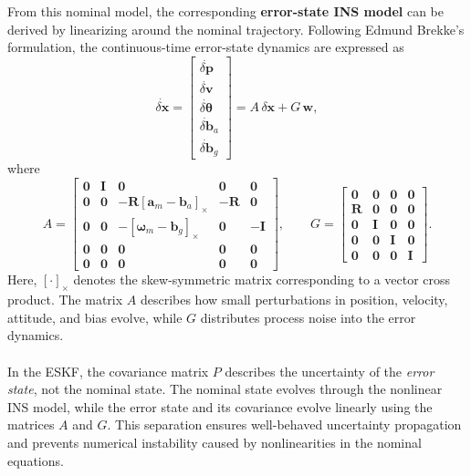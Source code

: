 \\ \\
From this nominal model, the corresponding \textbf{error-state INS model} can be derived by linearizing around the nominal trajectory. Following Edmund Brekke’s formulation, the continuous-time error-state dynamics are expressed as
$$
    \dot{\delta\mathbf{x}} =
    \begin{bmatrix}
        \dot{\delta\mathbf{p}} \\ \dot{\delta\mathbf{v}} \\ \dot{\delta\boldsymbol{\theta}} \\ \dot{\delta\mathbf{b}}_a \\ \dot{\delta\mathbf{b}}_g
    \end{bmatrix}
    =
    A \, \delta\mathbf{x} + G\,\mathbf{w},
$$
where
$$
A =
\begin{bmatrix}
    \mathbf{0} & \mathbf{I} & \mathbf{0} & \mathbf{0} & \mathbf{0} \\
    \mathbf{0} & \mathbf{0} & -\mathbf{R}[\mathbf{a}_m - \mathbf{b}_a]_\times & -\mathbf{R} & \mathbf{0} \\
    \mathbf{0} & \mathbf{0} & -[\boldsymbol{\omega}_m - \mathbf{b}_g]_\times & \mathbf{0} & -\mathbf{I} \\
    \mathbf{0} & \mathbf{0} & \mathbf{0} & \mathbf{0} & \mathbf{0} \\
    \mathbf{0} & \mathbf{0} & \mathbf{0} & \mathbf{0} & \mathbf{0}
\end{bmatrix},
\qquad
G =
\begin{bmatrix}
    \mathbf{0} & \mathbf{0} & \mathbf{0} & \mathbf{0} \\
    \mathbf{R} & \mathbf{0} & \mathbf{0} & \mathbf{0} \\
    \mathbf{0} & \mathbf{I} & \mathbf{0} & \mathbf{0} \\
    \mathbf{0} & \mathbf{0} & \mathbf{I} & \mathbf{0} \\
    \mathbf{0} & \mathbf{0} & \mathbf{0} & \mathbf{I}
\end{bmatrix}.
$$
Here, $[\cdot]_\times$ denotes the skew-symmetric matrix corresponding to a vector cross product. The matrix $A$ describes how small perturbations in position, velocity, attitude, and bias evolve, while $G$ distributes process noise into the error dynamics.  
\\ \\
In the ESKF, the covariance matrix $P$ describes the uncertainty of the \textit{error state}, not the nominal state. The nominal state evolves through the nonlinear INS model, while the error state and its covariance evolve linearly using the matrices $A$ and $G$. This separation ensures well-behaved uncertainty propagation and prevents numerical instability caused by nonlinearities in the nominal equations.  
